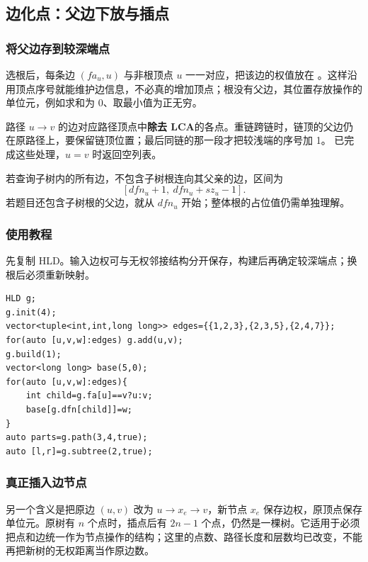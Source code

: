 \subsection{边化点：父边下放与插点}
\label{tree:edge-to-vertex}
\subsubsection*{将父边存到较深端点}
选根后，每条边 $(fa_u,u)$ 与非根顶点 $u$ 一一对应，把该边的权值放在 。这样沿用顶点序号就能维护边信息，不必真的增加顶点；根没有父边，其位置存放操作的单位元，例如求和为 0、取最小值为正无穷。

路径 $u\to v$ 的边对应路径顶点中\textbf{除去 LCA}的各点。重链跨链时，链顶的父边仍在原路径上，要保留链顶位置；最后同链的那一段才把较浅端的序号加 1。 已完成这些处理，$u=v$ 时返回空列表。

若查询子树内的所有边，不包含子树根连向其父亲的边，区间为
\[
    [dfn_u+1,\ dfn_u+sz_u-1].
\]
若题目还包含子树根的父边，就从 $dfn_u$ 开始；整体根的占位值仍需单独理解。
\subsubsection*{使用教程}
先复制 HLD。输入边权可与无权邻接结构分开保存，构建后再确定较深端点；换根后必须重新映射。
\begin{lstlisting}[style=mtycpp,numbers=none]
HLD g;
g.init(4);
vector<tuple<int,int,long long>> edges={{1,2,3},{2,3,5},{2,4,7}};
for(auto [u,v,w]:edges) g.add(u,v);
g.build(1);
vector<long long> base(5,0);
for(auto [u,v,w]:edges){
	int child=g.fa[u]==v?u:v;
	base[g.dfn[child]]=w;
}
auto parts=g.path(3,4,true);
auto [l,r]=g.subtree(2,true);
\end{lstlisting}
\subsubsection*{真正插入边节点}
另一个含义是把原边 $(u,v)$ 改为 $u\to x_e\to v$，新节点 $x_e$ 保存边权，原顶点保存单位元。原树有 $n$ 个点时，插点后有 $2n-1$ 个点，仍然是一棵树。它适用于必须把点和边统一作为节点操作的结构；这里的点数、路径长度和层数均已改变，不能再把新树的无权距离当作原边数。
